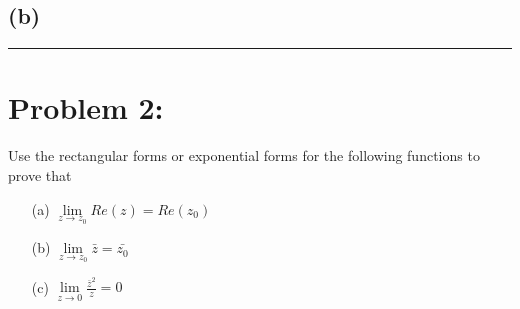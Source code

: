 \documentclass{article}
\begin{document}
\subsection*{(b)}
  \begin{center}
\begin{minipage}{0.45\textwidth}
    \centering
    
\end{minipage}
\hfill
\begin{minipage}{0.45\textwidth}
    \centering
    
\end{minipage}
\end{center}


\hrule %

\newpage
\section*{Problem 2: }
Use the rectangular forms or exponential forms for the following functions to prove that
		\begin{enumerate}
			\item[(a)]  $\lim\limits_{z\to z_0} Re(z) = Re(z_0)$
			\item[(b)] $\lim\limits_{z\to z_0} \bar{z} = \bar{z_0} $
			\item[(c)] $\lim\limits_{z\to 0} \frac{\bar{z}^2}{z} = 0$
		\end{enumerate}

\end{document}
